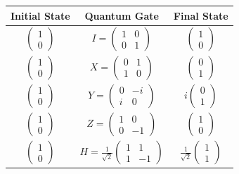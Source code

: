 \documentclass[onecolumn,10pt,cleanfoot]{asme2ej}
\begin{document}
\begin{center}
\renewcommand{\arraystretch}{1.5}
\begin{tabular}{|c|c|c|}
\hline
Initial State & Quantum Gate & Final State \\
\hline
$\begin{pmatrix} 1 \\ 0 \end{pmatrix}$ & $I = \begin{pmatrix} 1 & 0 \\ 0 & 1 \end{pmatrix}$ & $\begin{pmatrix} 1 \\ 0 \end{pmatrix}$ \\
\hline
$\begin{pmatrix} 1 \\ 0 \end{pmatrix}$ & $X = \begin{pmatrix} 0 & 1 \\ 1 & 0 \end{pmatrix}$ & $\begin{pmatrix} 0 \\ 1 \end{pmatrix}$ \\
\hline
$\begin{pmatrix} 1 \\ 0 \end{pmatrix}$ & $Y = \begin{pmatrix} 0 & -i \\ i & 0 \end{pmatrix}$ & $i\begin{pmatrix} 0 \\ 1 \end{pmatrix}$ \\
\hline
$\begin{pmatrix} 1 \\ 0 \end{pmatrix}$ & $Z = \begin{pmatrix} 1 & 0 \\ 0 & -1 \end{pmatrix}$ & $\begin{pmatrix} 1 \\ 0 \end{pmatrix}$ \\
\hline
$\begin{pmatrix} 1 \\ 0 \end{pmatrix}$ & $H = \frac{1}{\sqrt{2}}\begin{pmatrix} 1 & 1 \\ 1 & -1 \end{pmatrix}$ & $\frac{1}{\sqrt{2}}\begin{pmatrix} 1 \\ 1 \end{pmatrix}$ \\

\end{tabular}
\end{center}
\end{document}
